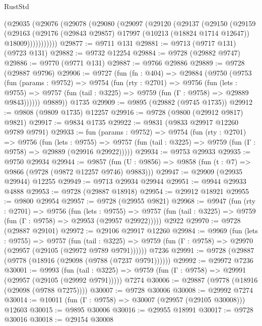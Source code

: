 \begin{lexlean}{RustStd}
\begin{coremodule}
{\begin{coremodule}
{{{{{{{{{{{{{{{{{{{{{{{{{{    (@29035
      (@29076
        (@29078
          (@29080
            (@29097
              (@29120
                (@29137
                  (@29150
                    (@29159
                      (@29163
                        (@29176
                          (@29843 @29857)
                          @17997
                          (@10213 (@18824 @1714 @12647))
                          @18009)))))))))))
@29877 := @9711 @131
@29881 := @9713 (@9717 @131) (@9723 @131)
@29882 := @9732 @12254
@29884 := @9728 (@29882 @9747)
@29886 := @9770 (@9771 @131)
@29887 := @9766 @29886
@29889 := @9728 (@29887 @9796)
@29906 := @9727
    (fun (fn : @404) =>
    @29884
      (@9750
        (@9753
          (fun (params : @9752) =>
          @9754
            (fun (rty : @2701) =>
            @9756
              (fun (lets : @9755) =>
              @9757 (fun (tail : @3225) => @9759 (fun (Γ : @9758) => @29889 @9843))))))
        @9889))
    @1735
@29909 := @9895 (@29882 (@9745 @1735))
@29912 := @9808 (@9809 @1735) @12257
@29916 := @9728 (@9800 (@29912 @9817) @9821)
@29917 := @9834 @1735
@29922 := @9831 (@9833 @29917 @12260 @9789 @9791)
@29933 := fun (params : @9752) =>
  @9754
    (fun (rty : @2701) =>
    @9756
      (fun (lets : @9755) =>
      @9757 (fun (tail : @3225) => @9759 (fun (Γ : @9758) => @29889 (@29916 @29922)))))
@29934 := @9753 @29933
@29935 := @9750 @29934
@29944 := @9857
    (fun (U : @9856) => @9858 (fun (t : @7) => @9866 (@9728 (@9872 @12257 @9746) @9883)))
@29947 := @29909 (@29935 @29944) @12255
@29949 := @9713 @29934 @29944
@29951 := @9944 @29933 @4888
@29953 := @9728 (@29887 @18918)
@29954 := @29912 @18921
@29955 := @9800 @29954
@29957 := @9728 (@29955 @9821)
@29968 := @9947
    (fun (rty : @2701) =>
    @9756
      (fun (lets : @9755) =>
      @9757 (fun (tail : @3225) => @9759 (fun (Γ : @9758) => @29953 (@29957 @29922)))))
    @2922
@29970 := @9728 (@29887 @29101)
@29972 := @29106 @29917 @12260
@29984 := @9969
    (fun (lets : @9755) =>
    @9757
      (fun (tail : @3225) =>
      @9759 (fun (Γ : @9758) => @29970 (@29957 (@29105 (@29972 @9789 @9791))))))
    @7236
@29991 := @9728 (@29887 (@9778 (@18916 (@29098 (@9788 (@7237 @9791))))))
@29992 := @29972 @7236
@30001 := @9993
    (fun (tail : @3225) => @9759 (fun (Γ : @9758) => @29991 (@29957 (@29105 (@29992 @9791)))))
    @7274
@30006 := @29887 (@9778 (@18916 (@29098 (@9788 @7275))))
@30007 := @9728 @30006
@30008 := @29992 @7274
@30014 := @10011 (fun (Γ : @9758) => @30007 (@29957 (@29105 @30008))) @12603
@30015 := @9895 @30006
@30016 := @29955 @18991
@30017 := @9728 @30016
@30018 := @29154 @30008
}}}}}}}}}}}}}}}}}}}}}}}}}}
\end{coremodule}}
\end{coremodule}
\end{lexlean}
